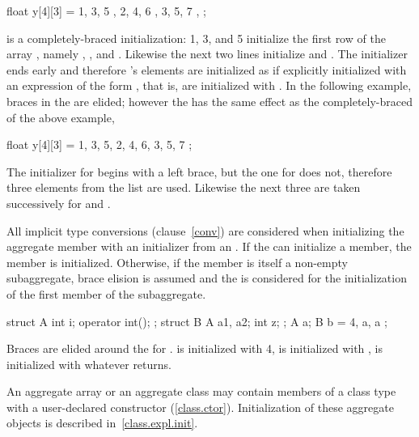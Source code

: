 \begin{codeblock}
float y[4][3] = {
    { 1, 3, 5 },
    { 2, 4, 6 },
    { 3, 5, 7 },
};
\end{codeblock}

is a completely-braced initialization:
1, 3, and 5 initialize the first row of the array
,
namely
,
,
and
.
Likewise the next two lines initialize
and
.
The initializer ends early and therefore
's
elements are initialized as if explicitly initialized with an
expression of the form
,
that is, are initialized with
.
In the following example, braces in the
are elided;
however the
has the same effect as the completely-braced
of the above example,

\begin{codeblock}
float y[4][3] = {
    1, 3, 5, 2, 4, 6, 3, 5, 7
};
\end{codeblock}

The initializer for
begins with a left brace, but the one for
does not,
therefore three elements from the list are used.
Likewise the next three are taken successively for
and
.
\exitexampleb

\pnum
All implicit type conversions (clause~\ref{conv}) are considered when
initializing the aggregate member with an initializer from an
.
If the
can initialize a member, the member is initialized.
Otherwise, if the member is itself a non-empty subaggregate,
brace elision is assumed and the
is considered for the initialization of the first member of the subaggregate.\\
\enterexample

\begin{codeblock}
struct A {
    int i;
    operator int();
};
struct B {
    A a1, a2;
    int z;
};
A a;
B b = { 4, a, a };
\end{codeblock}

Braces are elided around the
for
.
is initialized with 4,
is initialized with
,
is initialized with whatever
returns.
\exitexample

\pnum
{}%
\enternote
An aggregate array or an aggregate class may contain members of a
class type with a user-declared constructor (\ref{class.ctor}).
Initialization of these aggregate objects is described in~\ref{class.expl.init}.
\exitnote

